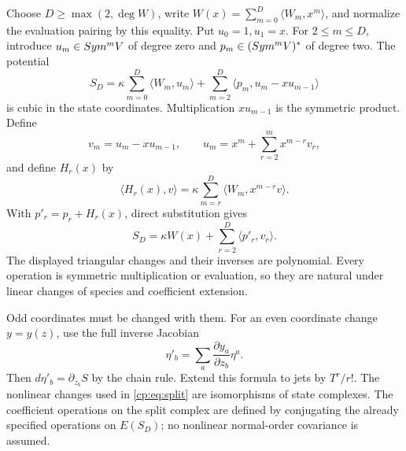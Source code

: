 Choose \(D\geq\max(2,\deg W)\), write
\(W(x)=\sum_{m=0}^D\langle W_m,x^m\rangle\), and normalize the
evaluation pairing by this equality.  Put \(u_0=1,u_1=x\).
For \(2\leq m\leq D\), introduce
\(u_m\in Sym^mV\) of degree zero and
\(p_m\in(Sym^mV)^*\) of degree two.  The potential
\begin{equation}\label{cp:eq:canonical}
 S_D=
 \kappa\sum_{m=0}^D\langle W_m,u_m\rangle
 +\sum_{m=2}^D\langle p_m,u_m-xu_{m-1}\rangle
\end{equation}
is cubic in the state coordinates.  Multiplication \(xu_{m-1}\)
is the symmetric product.  Define
\[
 v_m=u_m-xu_{m-1},\qquad
 u_m=x^m+\sum_{r=2}^m x^{m-r}v_r,
\]
and define \(H_r(x)\) by
\[
 \langle H_r(x),v\rangle
       =\kappa\sum_{m=r}^D\langle W_m,x^{m-r}v\rangle.
\]
With \(p'_r=p_r+H_r(x)\), direct substitution gives
\begin{equation}\label{cp:eq:split}
 S_D=\kappa W(x)+\sum_{r=2}^D\langle p'_r,v_r\rangle.
\end{equation}
The displayed triangular changes and their inverses are polynomial.
Every operation is symmetric multiplication or evaluation, so they
are natural under linear changes of species and coefficient extension.

Odd coordinates must be changed with them.  For an even coordinate
change \(y=y(z)\), use the full inverse Jacobian
\begin{equation}\label{cp:eq:odd-change}
 \eta'_b=\sum_a\frac{\partial y_a}{\partial z_b}\eta^a.
\end{equation}
Then \(d\eta'_b=\partial_{z_b}S\) by the chain rule.  Extend this
formula to jets by \(T^r/r!\).  The nonlinear changes used in
\eqref{cp:eq:split} are isomorphisms of state complexes.  The
coefficient operations on the split complex are defined by conjugating
the already specified operations on \(E(S_D)\); no nonlinear
normal-order covariance is assumed.

